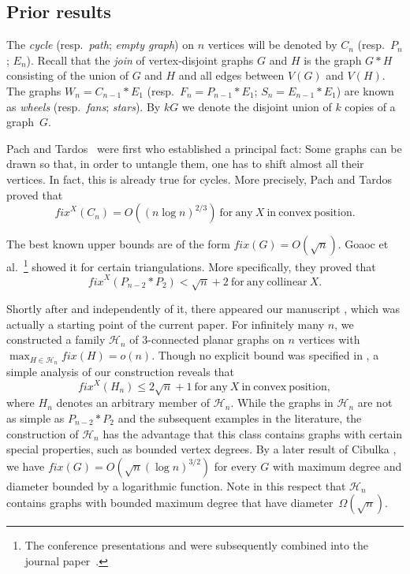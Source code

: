 \documentclass[reqno,12pt]{amsart}
\newcommand{\fix}[1]{\mathit{fix}(#1)}
\newcommand{\fixx}[1]{\mathit{fix}^X(#1)}
\newcommand{\calH}{{\mathcal H}}
\begin{document}
\subsection{Prior results}\label{ss:prior}
The \emph{cycle} (resp.\ \emph{path}; \emph{empty graph})
on $n$ vertices will be denoted by $C_n$ (resp.\ $P_n$; $E_n$).
Recall that the \emph{join} of vertex-disjoint graphs $G$ and $H$
is the graph $G*H$ consisting of the union of $G$ and $H$ and all
edges between $V(G)$ and $V(H)$. The graphs $W_n=C_{n-1}*E_1$ (resp.\
$F_n=P_{n-1}*E_1$; $S_n=E_{n-1}*E_1$) are known as \emph{wheels} (resp.\
\emph{fans}; \emph{stars}). By $kG$ we denote
the disjoint union of $k$ copies of a graph~$G$.

Pach and Tardos~\cite{PTa} were first who established a principal fact:
Some graphs can be drawn so that, in order to untangle them, one has
to shift almost all their vertices. In fact, 
this is already true for cycles.
More precisely,  Pach and Tardos~\cite{PTa} proved that
\begin{equation}\label{eq:PTa}
\fixx{C_n}=O((n\log n)^{2/3})\mathrm{\ for\ any\ }X\mathrm{\ in\ convex\ position}.
\end{equation}


The best known upper bounds are of the form $\fix G=O(\sqrt n)$.
Goaoc et al.\ \cite{Goaoc}\footnote{The conference presentations \cite{Goaoc} and \cite{SWo} were subsequently combined
into the journal paper~\cite{merged}.}
showed it for certain triangulations. 
More specifically, they proved that
\begin{equation}\label{eq:Goaoc}
\fixx{P_{n-2}*P_2}<\sqrt n+2\mathrm{\ for \ any\ collinear\ }X.
\end{equation}

Shortly after \cite{Goaoc} and independently of it,
there appeared our manuscript \cite{KSchV}, which was actually 
a starting point of the current paper. For infinitely many $n$,
we constructed a family $\calH_n$ of 3-connected
planar graphs on $n$ vertices with $\max_{H\in\calH_n}\fix{H}=o(n)$. Though no explicit bound was
specified in \cite{KSchV}, a simple analysis of our construction
reveals that
\begin{equation}\label{eq:fix}
\fixx{H_n}\le2\sqrt n+1\mathrm{\ for\ any\ }X\mathrm{\ in\ convex\ position,}
\end{equation}
where $H_n$ denotes an arbitrary member of $\calH_n$.
While the graphs in $\calH_n$ are not as simple as $P_{n-2}*P_2$ and the subsequent examples in the
literature, the construction of $\calH_n$ has the advantage that this class contains graphs with
certain special properties, such as bounded vertex degrees.
By a later result of Cibulka \cite{Cib}, we have $\fix G=O(\sqrt n(\log n)^{3/2})$
for every $G$ with maximum degree and diameter bounded by a logarithmic function. 
Note in this respect that $\calH_n$ contains graphs with bounded maximum degree that
have diameter~$\Omega(\sqrt n)$.
\end{document}
